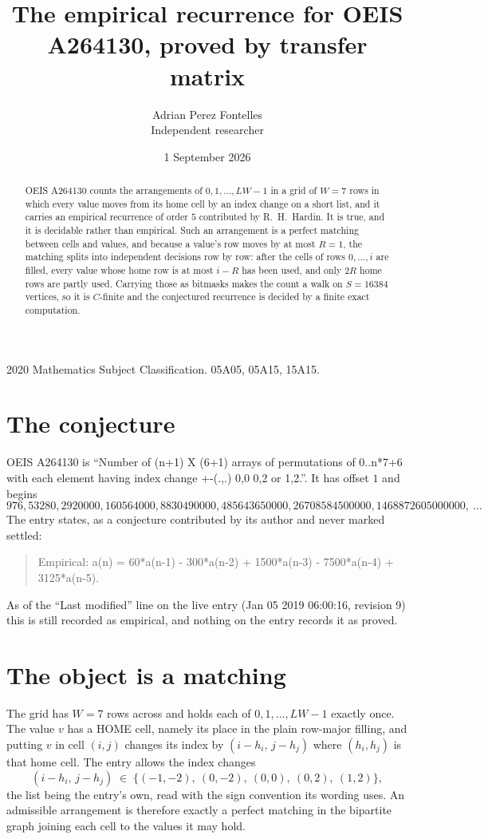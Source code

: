 \documentclass[11pt,a4paper]{article}
\title{The empirical recurrence for OEIS A264130, proved by transfer matrix}
\author{Adrian Perez Fontelles\\ \small Independent researcher}
\date{1 September 2026}
\theoremstyle{plain}
\theoremstyle{definition}
\begin{document}
\maketitle

\begin{abstract}
OEIS A264130 counts the arrangements of $0,1,\dots,LW-1$ in a grid of $W=7$ rows in which
every value moves from its home cell by an index change on a short list, and it carries an
empirical recurrence of order $5$ contributed by R.~H.~Hardin. It is true, and it is
decidable rather than empirical. Such an arrangement is a perfect matching between cells and
values, and because a value's row moves by at most $R=1$, the matching splits into
independent decisions row by row: after the cells of rows $0,\dots,i$ are filled,
every value whose home row is at most $i-R$ has been used, and only $2R$ home rows are
partly used. Carrying those as bitmasks makes the count a walk on $S=16384$ vertices, so it is
$C$-finite and the conjectured recurrence is decided by a finite exact computation.
\end{abstract}

\noindent\small 2020 Mathematics Subject Classification. 05A05, 05A15, 15A15.\normalsize

\section{The conjecture}

OEIS A264130 is ``Number of (n+1) X (6+1) arrays of permutations of 0..n*7+6 with each element having index change +-(.,.) 0,0 0,2 or 1,2.''. It has offset $1$ and begins
\[
976, 53280, 2920000, 160564000, 8830490000, 485643650000, 26708584500000, 1468872605000000,\ \dots
\]
The entry states, as a conjecture contributed by its author and never marked settled:
\begin{quote}
Empirical: a(n) = 60*a(n-1) - 300*a(n-2) + 1500*a(n-3) - 7500*a(n-4) + 3125*a(n-5).
\end{quote}
As of the ``Last modified'' line on the live entry (Jan 05 2019 06:00:16, revision 9) this is still
recorded as empirical, and nothing on the entry records it as proved.

\section{The object is a matching}

The grid has $W=7$ rows across and holds each of $0,1,\dots,LW-1$ exactly once. The value
$v$ has a HOME cell, namely its place in the plain row-major filling, and putting $v$ in cell
$(i,j)$ changes its index by $(i-h_i,\,j-h_j)$ where $(h_i,h_j)$ is that home cell. The entry
allows the index changes
\[
(i-h_i,\,j-h_j)\;\in\;\{(-1,-2),\ (0,-2),\ (0,0),\ (0,2),\ (1,2)\},
\]
the list being the entry's own, read with the sign convention its wording uses. An admissible
arrangement is therefore exactly a perfect matching in the bipartite graph joining each cell to
the values it may hold.
\end{document}
